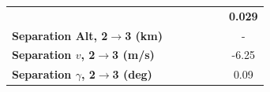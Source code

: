 \begin{table}[ht]
\begin{tabular}{l c c c c c c}
		& \textbf{\secondExergyEffmThreeNinety}
		& \textbf{\secondExergyEffmThreeNinetyFive}
		& \textbf{\secondExergyEffmThreeStandard}
		& \textbf{\secondExergyEffmThreeOneHundredFive}
		& \textbf{\secondExergyEffmThreeOneHundredTen}
		& \textbf{0.029}
		\\
		\textbf{Separation Alt, 2$\rightarrow$3 (km)}
		& \secondthirdSeparationAltmThreeNinety
		& \secondthirdSeparationAltmThreeNinetyFive
		& \secondthirdSeparationAltmThreeStandard
		& \secondthirdSeparationAltmThreeOneHundredFive
		& \secondthirdSeparationAltmThreeOneHundredTen
		& -
		\\
		\textbf{Separation $v$, 2$\rightarrow$3 (m/s)}
		& \secondthirdSeparationvmThreeNinety
		& \secondthirdSeparationvmThreeNinetyFive
		& \secondthirdSeparationvmThreeStandard
		& \secondthirdSeparationvmThreeOneHundredFive
		& \secondthirdSeparationvmThreeOneHundredTen
		&-6.25
		\\
		\textbf{Separation $\gamma$, 2$\rightarrow$3 (deg)}
		& \secondthirdSeparationgammamThreeNinety
		& \secondthirdSeparationgammamThreeNinetyFive
		& \secondthirdSeparationgammamThreeStandard
		& \secondthirdSeparationgammamThreeOneHundredFive
		& \secondthirdSeparationgammamThreeOneHundredTen
		&0.09
		\\
	

\end{tabular}
\end{table}
